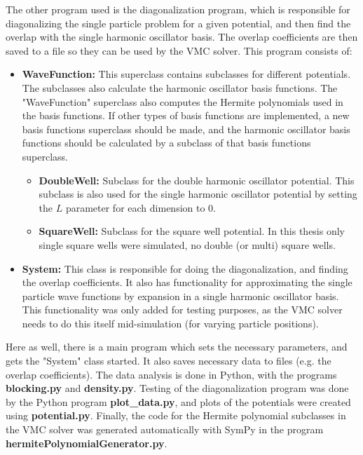 \documentclass[../main.tex]{subfiles}
\begin{document}
\begin{appendices}
The other program used is the diagonalization program, which is responsible for diagonalizing the single particle problem for a given potential, and then find the overlap with the single harmonic oscillator basis. The overlap coefficients are then saved to a file so they can be used by the VMC solver. This program consists of:
\begin{itemize}
    \item \textbf{WaveFunction:} This superclass contains subclasses for different potentials. The subclasses also calculate the harmonic oscillator basis functions. The "WaveFunction" superclass also computes the Hermite polynomials used in the basis functions. If other types of basis functions are implemented, a new basis functions superclass should be made, and the harmonic oscillator basis functions should be calculated by a subclass of that basis functions superclass. 
    \begin{itemize}
        \item \textbf{DoubleWell:} Subclass for the double harmonic oscillator potential. This subclass is also used for the single harmonic oscillator potential by setting the $L$ parameter for each dimension to $0$.
        \item \textbf{SquareWell:} Subclass for the square well potential. In this thesis only single square wells were simulated, no double (or multi) square wells.
    \end{itemize}
    \item \textbf{System:} This class is responsible for doing the diagonalization, and finding the overlap coefficients. It also has functionality for approximating the single particle wave functions by expansion in a single harmonic oscillator basis. This functionality was only added for testing purposes, as the VMC solver needs to do this itself mid-simulation (for varying particle positions).
\end{itemize}

Here as well, there is a main program which sets the necessary parameters, and gets the "System" class started. It also saves necessary data to files (e.g. the overlap coefficients). The data analysis is done in Python, with the programs {\bf blocking.py} and {\bf density.py}. Testing of the diagonalization program was done by the Python program \textbf{plot\_data.py}, and plots of the potentials were created using \textbf{potential.py}. Finally, the code for the Hermite polynomial subclasses in the VMC solver was generated automatically with SymPy in the program \textbf{hermitePolynomialGenerator.py}.


\end{appendices}
\end{document}
